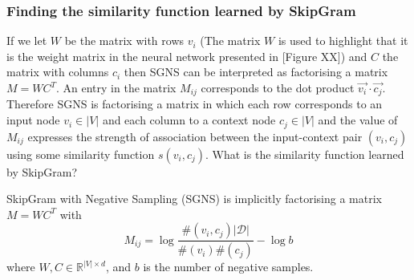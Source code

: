 \documentclass[a4paper]{article}
\begin{document}
\subsubsection{Finding the similarity function learned by SkipGram}
If we let $W$ be the matrix with rows $v_i$ (The matrix $W$ is used to highlight
that it is the weight matrix in the neural network presented in [Figure XX]) and $C$ the matrix with columns
$c_i$ then SGNS can be interpreted as factorising a matrix $M = WC^T$. An entry in the matrix $M_{ij}$ corresponds to the dot product $\vec{v_i} \cdot
\vec{c_j}$. Therefore SGNS is factorising a matrix in which each row corresponds
to an input node $v_i \in |V|$ and each column to a context node $c_j \in |V|$ and the value of $M_{ij}$ expresses the
strength of association between the input-context pair $(v_i, c_j)$ using some similarity
function $s(v_i,c_j)$. What is the similarity function learned by SkipGram? 
\begin{theorem}
  SkipGram with Negative Sampling (SGNS) is implicitly factorising a matrix $M =
  WC^T$ with
  \[M_{ij} = \log{\frac{\#(v_i,c_j)|\mathcal{D}|}{\#(v_i)\#(c_j)}} - \log{b}\]
  where $W, C \in \mathbb{R}^{|V| \times d}$, and $b$ is the number of negative samples.
\end{theorem}
\end{document}
